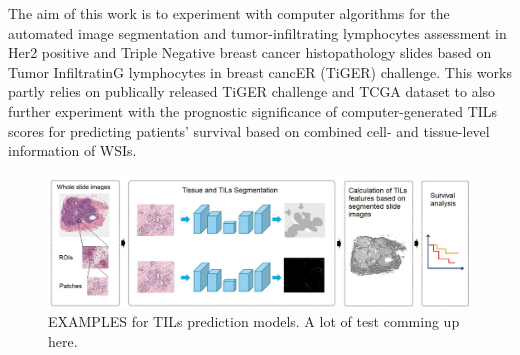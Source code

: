 The aim of this work is to experiment with computer algorithms for the automated image segmentation and tumor-infiltrating
lymphocytes assessment in Her2 positive
and Triple Negative breast cancer histopathology slides based on Tumor InfiltratinG lymphocytes in
breast cancER (TiGER) challenge. This works partly relies on publically
released TiGER challenge and TCGA dataset to also further experiment with the prognostic significance of computer-generated TILs scores
for predicting patients' survival based on combined cell- and tissue-level information of WSIs. 

\begin{figure}
\includegraphics[width=\linewidth]{figures/overview.jpg}
\caption{EXAMPLES for TILs prediction models. A lot of test comming up here.}
\label{fig:figure3}
\end{figure}

